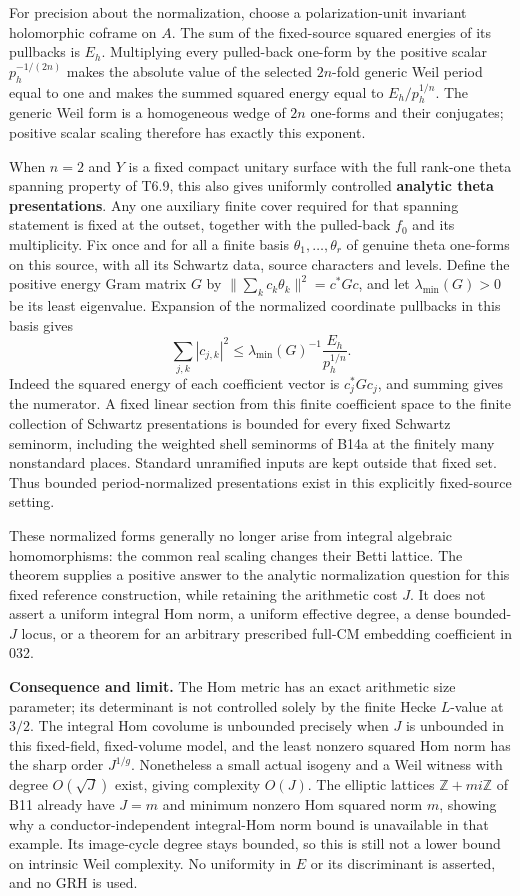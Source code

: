 \documentclass[11pt,a4paper]{article}
\theoremstyle{definition}
\begin{document}
For precision about the normalization, choose a polarization-unit invariant holomorphic coframe on \(A\). The sum of the fixed-source squared energies of its pullbacks is \(E_h\). Multiplying every pulled-back one-form by the positive scalar \(p_h^{-1/(2n)}\) makes the absolute value of the selected \(2n\)-fold generic Weil period equal to one and makes the summed squared energy equal to \(E_h/p_h^{1/n}\). The generic Weil form is a homogeneous wedge of \(2n\) one-forms and their conjugates; positive scalar scaling therefore has exactly this exponent.

When \(n=2\) and \(Y\) is a fixed compact unitary surface with the full rank-one theta spanning property of T6.9, this also gives uniformly controlled \textbf{analytic theta presentations}. Any one auxiliary finite cover required for that spanning statement is fixed at the outset, together with the pulled-back \(f_0\) and its multiplicity. Fix once and for all a finite basis \(\theta_1,\ldots,\theta_r\) of genuine theta one-forms on this source, with all its Schwartz data, source characters and levels. Define the positive energy Gram matrix \(G\) by \(\|\sum_k c_k\theta_k\|^2=c^*Gc\), and let \(\lambda_{\min}(G)>0\) be its least eigenvalue. Expansion of the normalized coordinate pullbacks in this basis gives \[
 \sum_{j,k}|c_{j,k}|^2
 \le \lambda_{\min}(G)^{-1}\frac{E_h}{p_h^{1/n}}.
\tag{B19.16}
\] Indeed the squared energy of each coefficient vector is \(c_j^*Gc_j\), and summing gives the numerator. A fixed linear section from this finite coefficient space to the finite collection of Schwartz presentations is bounded for every fixed Schwartz seminorm, including the weighted shell seminorms of B14a at the finitely many nonstandard places. Standard unramified inputs are kept outside that fixed set. Thus bounded period-normalized presentations exist in this explicitly fixed-source setting.

These normalized forms generally no longer arise from integral algebraic homomorphisms: the common real scaling changes their Betti lattice. The theorem supplies a positive answer to the analytic normalization question for this fixed reference construction, while retaining the arithmetic cost \(J\). It does not assert a uniform integral Hom norm, a uniform effective degree, a dense bounded-\(J\) locus, or a theorem for an arbitrary prescribed full-CM embedding coefficient in 032.

\textbf{Consequence and limit.} The Hom metric has an exact arithmetic size parameter; its determinant is not controlled solely by the finite Hecke \(L\)-value at \(3/2\). The integral Hom covolume is unbounded precisely when \(J\) is unbounded in this fixed-field, fixed-volume model, and the least nonzero squared Hom norm has the sharp order \(J^{1/g}\). Nonetheless a small actual isogeny and a Weil witness with degree \(O(\sqrt J)\) exist, giving complexity \(O(J)\). The elliptic lattices \(\mathbb Z+mi\mathbb Z\) of B11 already have \(J=m\) and minimum nonzero Hom squared norm \(m\), showing why a conductor-independent integral-Hom norm bound is unavailable in that example. Its image-cycle degree stays bounded, so this is still not a lower bound on intrinsic Weil complexity. No uniformity in \(E\) or its discriminant is asserted, and no GRH is used.
\end{document}
